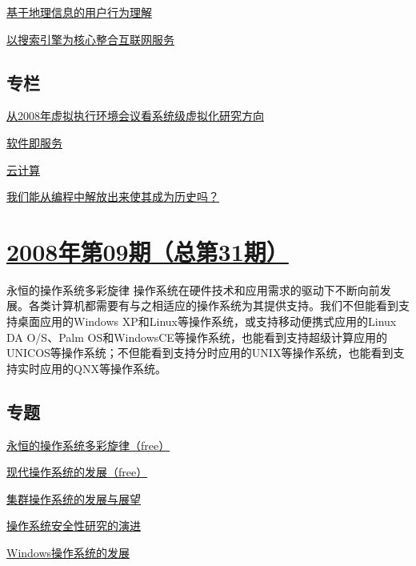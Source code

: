 \documentclass[a4paper]{article}
\begin{document}
\href{http://history.ccf.org.cn/resources/1190201776262/2010/04/15/032043.pdf}{基于地理信息的用户行为理解}

\href{http://history.ccf.org.cn/resources/1190201776262/2010/04/15/032050.pdf}{以搜索引擎为核心整合互联网服务}

\subsection{专栏}
\href{http://history.ccf.org.cn/resources/1190201776262/2010/04/15/032056.pdf}{从2008年虚拟执行环境会议看系统级虚拟化研究方向}

\href{http://history.ccf.org.cn/resources/1190201776262/2010/04/15/032078.pdf}{软件即服务}

\href{http://history.ccf.org.cn/resources/1190201776262/2010/04/15/032083.pdf}{云计算}

\href{http://history.ccf.org.cn/resources/1190201776262/2010/04/15/032066.pdf}{我们能从编程中解放出来使其成为历史吗？}


\section{\href{http://history.ccf.org.cn/sites/ccf/jsjtbbd.jsp?contentId=2542567629010}{\textbf{2008年第09期（总第31期）}}}
永恒的操作系统多彩旋律 操作系统在硬件技术和应用需求的驱动下不断向前发展。各类计算机都需要有与之相适应的操作系统为其提供支持。我们不但能看到支持桌面应用的Windows XP和Linux等操作系统，或支持移动便携式应用的Linux DA O/S、Palm OS和WindowsCE等操作系统，也能看到支持超级计算应用的UNICOS等操作系统；不但能看到支持分时应用的UNIX等操作系统，也能看到支持实时应用的QNX等操作系统。
\subsection{专题}
\href{http://history.ccf.org.cn/resources/1190201776262/2010/04/15/031012.pdf}{永恒的操作系统多彩旋律（free）}

\href{http://history.ccf.org.cn/resources/1190201776262/2010/04/15/031015.pdf}{现代操作系统的发展（free）}

\href{http://history.ccf.org.cn/resources/1190201776262/2010/04/15/031023.pdf}{集群操作系统的发展与展望}

\href{http://history.ccf.org.cn/resources/1190201776262/2010/04/15/031031.pdf}{操作系统安全性研究的演进}

\href{http://history.ccf.org.cn/resources/1190201776262/2010/04/15/031040.pdf}{Windows操作系统的发展}
\end{document}

